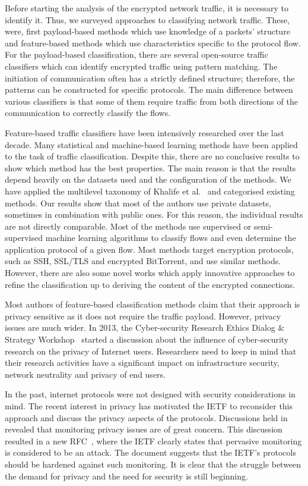 Before starting the analysis of the encrypted network traffic, it is necessary to identify it. Thus, we surveyed approaches to classifying network traffic. These, were, first payload-based methods which use knowledge of a packets' structure and feature-based methods which use characteristics specific to the protocol flow. For the payload-based classification, there are several open-source traffic classifiers which can identify encrypted traffic using pattern matching. The initiation of communication often has a strictly defined structure; therefore, the patterns can be constructed for specific protocols. The main difference between various classifiers is that some of them require traffic from both directions of the communication to correctly classify the flows.

Feature-based traffic classifiers have been intensively researched over the last decade. Many statistical and machine-based learning methods have been applied to the task of traffic classification. Despite this, there are no conclusive results to show which method has the best properties. The main reason is that the results depend heavily on the datasets used and the configuration of the methods. We have applied the multilevel taxonomy of Khalife et al.~\cite{Khalife-2014-multilevel} and categorised existing methods. Our results show that most of the authors use private datasets, sometimes in combination with public ones. For this reason, the individual results are not directly comparable. Most of the methods use supervised or semi-supervised machine learning algorithms to classify flows and even determine the application protocol of a given flow. Most methods target encryption protocols, such as SSH, SSL/TLS and encrypted BitTorrent, and use similar methods. However, there are also some novel works which apply innovative approaches to refine the classification up to deriving the content of the encrypted connections.

Most authors of feature-based classification methods claim that their approach is privacy sensitive as it does not require the traffic payload. However, privacy issues are much wider. In 2013, the Cyber-security Research Ethics Dialog \& Strategy Workshop~\cite{CAIDA-2013-Cyber} started a discussion about the influence of cyber-security research on the privacy of Internet users. Researchers need to keep in mind that their research activities have a significant impact on infrastructure security, network neutrality and privacy of end users. 

In the past, internet protocols were not designed with security considerations in mind. The recent interest in privacy has motivated the IETF to reconsider this approach and discuss the privacy aspects of the protocols. Discussions held in~\cite{IETF-2014-IETF} revealed that monitoring privacy issues are of great concern. This discussion resulted in a new RFC~\cite{rfc7258}, where the IETF clearly states that pervasive monitoring is considered to be an attack. The document suggests that the IETF's protocols should be hardened against such monitoring. It is clear that the struggle between the demand for privacy and the need for security is still beginning.

